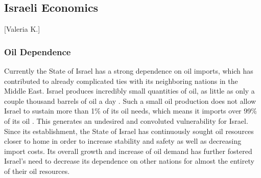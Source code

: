 \documentclass{article}                         %
\begin{document}

\subsection{Israeli Economics}[Valeria K.]
\subsubsection{Oil Dependence}
Currently the State of Israel has a strong dependence on oil imports, which has contributed to already complicated ties with its neighboring nations in the Middle East. Israel produces incredibly small quantities of oil, as little as only a couple thousand barrels of oil a day \cite{Engber2006WhereOil}. Such a small oil production does not allow Israel to sustain more than 1\% of its oil needs, which means it imports over 99\% of its oil \cite{Engber2006WhereOil}. This generates an undesired and convoluted vulnerability for Israel. Since its establishment, the State of Israel has continuously sought oil resources closer to home in order to increase stability and safety as well as decreasing import costs. Its overall growth and increase of oil demand has further fostered Israel's need to decrease its dependence on other nations for almost the entirety of their oil resources. 
\end{document}
